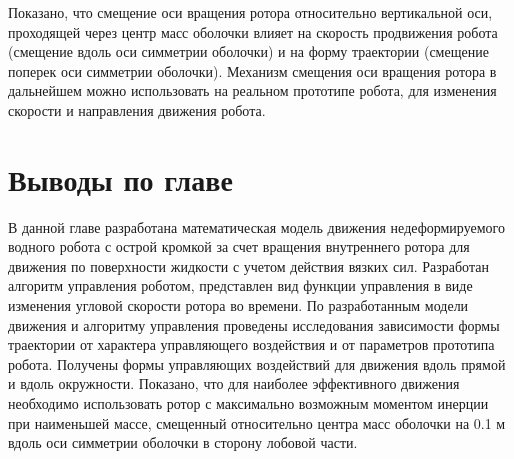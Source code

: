 Показано, что смещение оси вращения ротора относительно вертикальной оси, проходящей через центр масс оболочки влияет на скорость продвижения робота (смещение вдоль оси симметрии оболочки) и на форму траектории (смещение поперек оси симметрии оболочки). Механизм смещения оси вращения ротора в дальнейшем можно использовать на реальном прототипе робота, для изменения скорости и направления движения робота. 







\section{Выводы по главе}

В данной главе разработана математическая модель движения недеформируемого водного робота с острой кромкой за счет вращения внутреннего ротора для движения по поверхности жидкости с учетом действия вязких сил. Разработан алгоритм управления роботом, представлен вид функции управления в виде изменения угловой скорости ротора во времени. По разработанным модели движения и алгоритму управления проведены исследования зависимости формы траектории от характера управляющего воздействия и от параметров прототипа робота. Получены формы управляющих воздействий для движения вдоль прямой и вдоль окружности. Показано, что для наиболее эффективного движения необходимо использовать ротор с максимально возможным моментом инерции при наименьшей массе, смещенный относительно центра масс оболочки на 0.1 м вдоль оси симметрии оболочки в сторону лобовой части.


\clearpage